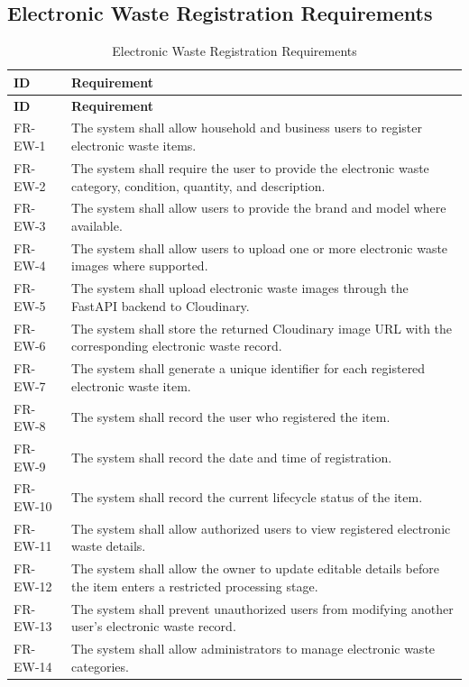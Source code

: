 \subsection{Electronic Waste Registration Requirements}
\begin{longtable}{@{}p{2.4cm}p{11cm}@{}}
\caption{Electronic Waste Registration Requirements} \label{tab:fr-ew} \\
\toprule \textbf{ID} & \textbf{Requirement} \\ \midrule
\endfirsthead
\toprule \textbf{ID} & \textbf{Requirement} \\ \midrule
\endhead
FR-EW-1 & The system shall allow household and business users to register electronic waste items. \\
FR-EW-2 & The system shall require the user to provide the electronic waste category, condition, quantity, and description. \\
FR-EW-3 & The system shall allow users to provide the brand and model where available. \\
FR-EW-4 & The system shall allow users to upload one or more electronic waste images where supported. \\
FR-EW-5 & The system shall upload electronic waste images through the FastAPI backend to Cloudinary. \\
FR-EW-6 & The system shall store the returned Cloudinary image URL with the corresponding electronic waste record. \\
FR-EW-7 & The system shall generate a unique identifier for each registered electronic waste item. \\
FR-EW-8 & The system shall record the user who registered the item. \\
FR-EW-9 & The system shall record the date and time of registration. \\
FR-EW-10 & The system shall record the current lifecycle status of the item. \\
FR-EW-11 & The system shall allow authorized users to view registered electronic waste details. \\
FR-EW-12 & The system shall allow the owner to update editable details before the item enters a restricted processing stage. \\
FR-EW-13 & The system shall prevent unauthorized users from modifying another user's electronic waste record. \\
FR-EW-14 & The system shall allow administrators to manage electronic waste categories. \\
\bottomrule
\end{longtable}

